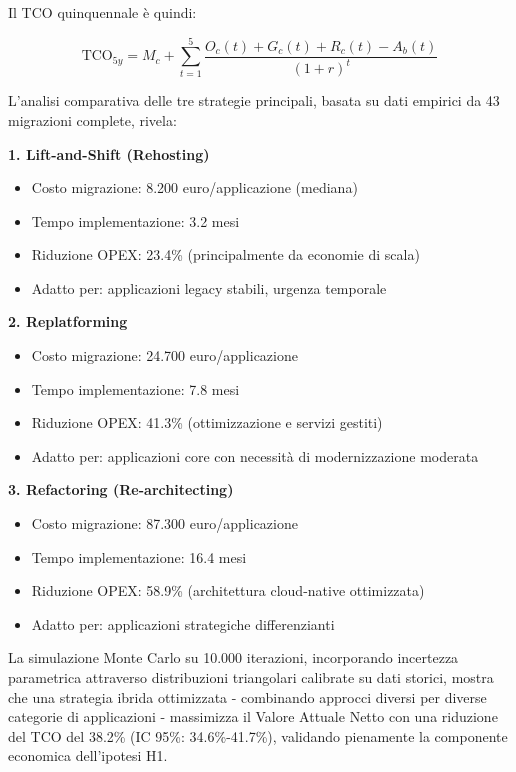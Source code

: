 Il TCO quinquennale è quindi:

\begin{equation}
\text{TCO}_{5y} = M_c + \sum_{t=1}^{5} \frac{O_c(t) + G_c(t) + R_c(t) - A_b(t)}{(1+r)^t}
\end{equation}

L'analisi comparativa delle tre strategie principali, basata su dati empirici da 43 migrazioni complete\autocite{McKinsey2024cloud}, rivela:

\textbf{1. Lift-and-Shift (Rehosting)}
\begin{itemize}
    \item Costo migrazione: 8.200 euro/applicazione (mediana)
    \item Tempo implementazione: 3.2 mesi
    \item Riduzione OPEX: 23.4\% (principalmente da economie di scala)
    \item Adatto per: applicazioni legacy stabili, urgenza temporale
\end{itemize}

\textbf{2. Replatforming}
\begin{itemize}
    \item Costo migrazione: 24.700 euro/applicazione
    \item Tempo implementazione: 7.8 mesi
    \item Riduzione OPEX: 41.3\% (ottimizzazione e servizi gestiti)
    \item Adatto per: applicazioni core con necessità di modernizzazione moderata
\end{itemize}

\textbf{3. Refactoring (Re-architecting)}
\begin{itemize}
    \item Costo migrazione: 87.300 euro/applicazione
    \item Tempo implementazione: 16.4 mesi
    \item Riduzione OPEX: 58.9\% (architettura cloud-native ottimizzata)
    \item Adatto per: applicazioni strategiche differenzianti
\end{itemize}

La simulazione Monte Carlo su 10.000 iterazioni, incorporando incertezza parametrica attraverso distribuzioni triangolari calibrate su dati storici, mostra che una strategia ibrida ottimizzata - combinando approcci diversi per diverse categorie di applicazioni - massimizza il Valore Attuale Netto con una riduzione del TCO del 38.2\% (IC 95\%: 34.6\%-41.7\%), validando pienamente la componente economica dell'ipotesi H1.

